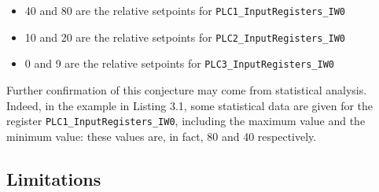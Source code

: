 \begin{itemize}
	\item 40 and 80 are the relative setpoints for \texttt{PLC1\_InputRegisters\_IW0}
	\item 10 and 20 are the relative setpoints for \texttt{PLC2\_InputRegisters\_IW0}
	\item 0 and 9 are the relative setpoints for \texttt{PLC3\_InputRegisters\_IW0}
\end{itemize} 

Further confirmation of this conjecture may come from statistical analysis. Indeed, in the example in Listing 3.1, some statistical data are given for the register \texttt{PLC1\_InputRegisters\_IW0}, including the maximum value and the minimum value: these values are, in fact, 80 and 40 respectively.

\subsection{Limitations}
\label{subsec:ceccato_limitations}

\nolinenumbers
